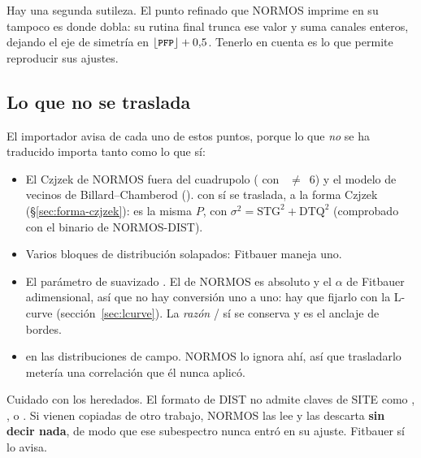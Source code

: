 Hay una segunda sutileza. El punto refinado que NORMOS imprime en su 
tampoco es donde dobla: su rutina final trunca ese valor y suma canales enteros,
dejando el eje de simetría en $\lfloor \texttt{\small PFP} \rfloor + 0{,}5$. Tenerlo en
cuenta es lo que permite reproducir sus ajustes.

\subsection*{Lo que no se traslada}

El importador avisa de cada uno de estos puntos, porque lo que \emph{no} se ha
traducido importa tanto como lo que sí:

\begin{itemize}[nosep]
  \item El Czjzek de NORMOS fuera del cuadrupolo ( con
        ~$\neq$~6) y el modelo de vecinos de Billard--Chamberod
        ().  con  sí se traslada,
        a la forma Czjzek (§\ref{sec:forma-czjzek}): es la misma $P$, con
        $\sigma^2=\mathrm{STG}^2+\mathrm{DTQ}^2$ (comprobado con el binario de
        NORMOS-DIST).
  \item Varios bloques de distribución solapados: Fitbauer maneja uno.
  \item El parámetro de suavizado . El de NORMOS es absoluto y el
        $\alpha$ de Fitbauer adimensional, así que no hay conversión uno a uno:
        hay que fijarlo con la L-curve (sección~\ref{sec:lcurve}). La
        \emph{razón} / sí se conserva y es el anclaje de
        bordes.
  \item {} en las distribuciones de campo. NORMOS lo ignora ahí, así que
        trasladarlo metería una correlación que él nunca aplicó.
\end{itemize}

\begin{aviso}
Cuidado con los  heredados. El formato de DIST no admite claves de
SITE como , ,  o . Si vienen copiadas
de otro trabajo, NORMOS las lee y las descarta \textbf{sin decir nada}, de modo
que ese subespectro nunca entró en su ajuste. Fitbauer sí lo avisa.
\end{aviso}
